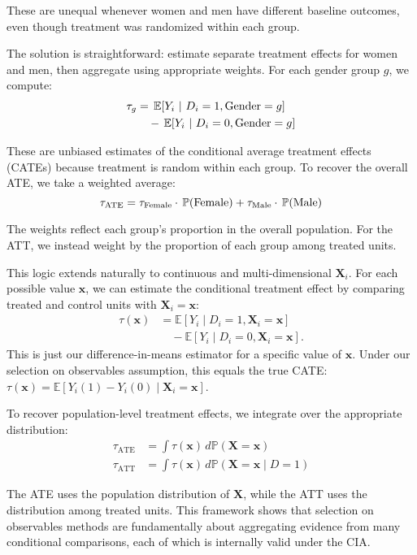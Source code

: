 \documentclass[12pt]{article}
\begin{document}
\begin{multicols}{2}
These are unequal whenever women and men have different baseline outcomes, even though treatment was randomized within each group.

The solution is straightforward: estimate separate treatment effects for women and men, then aggregate using appropriate weights.
For each gender group $g$, we compute:
\begin{align*}
  \tau_g 
  &= \expec{Y_i}{D_i = 1, \text{Gender} = g} \\
  &\quad - \expec{Y_i}{D_i = 0, \text{Gender} = g}
\end{align*}

These are unbiased estimates of the conditional average treatment effects (CATEs) because treatment is random within each group.
To recover the overall ATE, we take a weighted average:
$$\tau_{\text{ATE}} = \tau_{\text{Female}} \cdot \prob{\text{Female}} + \tau_{\text{Male}} \cdot \prob{\text{Male}}$$

The weights reflect each group's proportion in the overall population.
For the ATT, we instead weight by the proportion of each group among treated units.

This logic extends naturally to continuous and multi-dimensional $\bm{X}_i$.
For each possible value $\bm{x}$, we can estimate the conditional treatment effect by comparing treated and control units with $\bm{X}_i = \bm{x}$:
\begin{align*}
  \tau(\bm{x}) 
  &= \mathbb{E}[Y_i \mid D_i = 1, \bm{X}_i = \bm{x}] \\
  &\quad - \mathbb{E}[Y_i \mid D_i = 0, \bm{X}_i = \bm{x}].
\end{align*}
This is just our difference-in-means estimator for a specific value of $\bm{x}$.
Under our selection on observables assumption, this equals the true CATE: $\tau(\bm{x}) = \mathbb{E}[Y_i(1) - Y_i(0) \mid \bm{X}_i = \bm{x}]$.

To recover population-level treatment effects, we integrate over the appropriate distribution:
\begin{align*}
\tau_{\text{ATE}} &= \int \tau(\bm{x}) \, d\mathbb{P}(\bm{X} = \bm{x}) \\
\tau_{\text{ATT}} &= \int \tau(\bm{x}) \, d\mathbb{P}(\bm{X} = \bm{x} \mid D = 1)
\end{align*}

The ATE uses the population distribution of $\bm{X}$, while the ATT uses the distribution among treated units.
This framework shows that selection on observables methods are fundamentally about aggregating evidence from many conditional comparisons, each of which is internally valid under the CIA.


\end{multicols}
\end{document}
